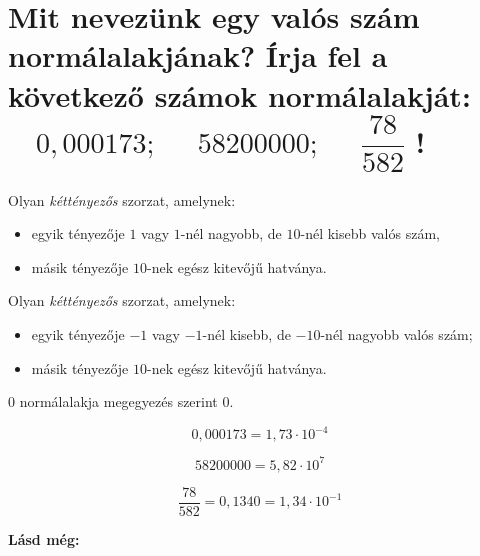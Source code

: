 
\section{Mit nevezünk egy valós szám normálalakjának? Írja fel a következő 
számok normálalakját:
\texorpdfstring{$\quad0,000173;$}{ 0,000173;}
\texorpdfstring{$\quad 58200000;$}{ 58200000;}
\texorpdfstring{$\quad\dfrac{78}{582}$}{ 78/582}
!}

\begin{defin}
Olyan \emph{kéttényezős} szorzat, amelynek:
\begin{itemize}
  \item egyik tényezője $1$ vagy $1$-nél nagyobb, de $10$-nél kisebb valós 
    szám,
  \item másik tényezője $10$-nek egész kitevőjű hatványa.
\end{itemize}
\end{defin}

\begin{defin}
Olyan \emph{kéttényezős} szorzat, amelynek:
\begin{itemize}
  \item egyik tényezője $-1$ vagy $-1$-nél kisebb, de $-10$-nél nagyobb valós
    szám;
  \item másik tényezője $10$-nek egész kitevőjű hatványa.
\end{itemize}
\end{defin}

\begin{note}
$0$ normálalakja megegyezés szerint $0$.
\end{note}

\[
  0,000173 = 1,73 \cdot 10^{-4}
\]

\[
  58200000 = 5,82 \cdot 10^7
\]

\[
  \frac{78}{582} = 0,1340 = 1,34 \cdot 10^{-1}
\]

\textbf{Lásd még:} 

